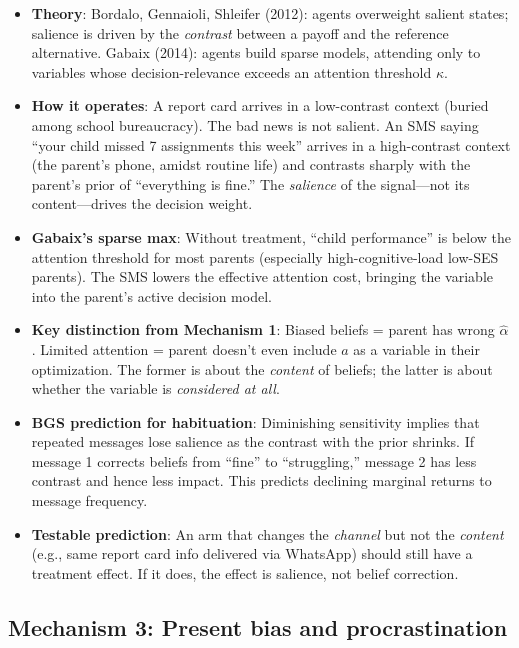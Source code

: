 \documentclass[11pt]{article}
\begin{document}
\begin{itemize}
  \item \textbf{Theory}: Bordalo, Gennaioli, Shleifer (2012): agents overweight salient states; salience is driven by the \emph{contrast} between a payoff and the reference alternative. Gabaix (2014): agents build sparse models, attending only to variables whose decision-relevance exceeds an attention threshold $\kappa$.
  \item \textbf{How it operates}: A report card arrives in a low-contrast context (buried among school bureaucracy). The bad news is not salient. An SMS saying ``your child missed 7 assignments this week'' arrives in a high-contrast context (the parent's phone, amidst routine life) and contrasts sharply with the parent's prior of ``everything is fine.'' The \emph{salience} of the signal---not its content---drives the decision weight.
  \item \textbf{Gabaix's sparse max}: Without treatment, ``child performance'' is below the attention threshold for most parents (especially high-cognitive-load low-SES parents). The SMS lowers the effective attention cost, bringing the variable into the parent's active decision model.
  \item \textbf{Key distinction from Mechanism 1}: Biased beliefs = parent has wrong $\hat{\alpha}$. Limited attention = parent doesn't even include $a$ as a variable in their optimization. The former is about the \emph{content} of beliefs; the latter is about whether the variable is \emph{considered at all}.
  \item \textbf{BGS prediction for habituation}: Diminishing sensitivity implies that repeated messages lose salience as the contrast with the prior shrinks. If message 1 corrects beliefs from ``fine'' to ``struggling,'' message 2 has less contrast and hence less impact. This predicts declining marginal returns to message frequency.
  \item \textbf{Testable prediction}: An arm that changes the \emph{channel} but not the \emph{content} (e.g., same report card info delivered via WhatsApp) should still have a treatment effect. If it does, the effect is salience, not belief correction.
\end{itemize}

\subsection{Mechanism 3: Present bias and procrastination}
\end{document}
